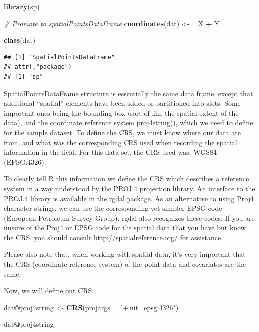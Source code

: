\documentclass[10pt,b5paper,]{book}
\newenvironment{Shaded}{\begin{snugshade}}{\end{snugshade}}
\newcommand{\CommentTok}[1]{\textcolor[rgb]{0.56,0.35,0.01}{\textit{#1}}}
\newcommand{\DataTypeTok}[1]{\textcolor[rgb]{0.13,0.29,0.53}{#1}}
\newcommand{\ErrorTok}[1]{\textcolor[rgb]{0.64,0.00,0.00}{\textbf{#1}}}
\newcommand{\KeywordTok}[1]{\textcolor[rgb]{0.13,0.29,0.53}{\textbf{#1}}}
\newcommand{\NormalTok}[1]{#1}
\newcommand{\OperatorTok}[1]{\textcolor[rgb]{0.81,0.36,0.00}{\textbf{#1}}}
\newcommand{\StringTok}[1]{\textcolor[rgb]{0.31,0.60,0.02}{#1}}
\theoremstyle{definition}
\theoremstyle{definition}
\theoremstyle{definition}
\theoremstyle{remark}
\begin{document}
\begin{Shaded}
\begin{Highlighting}[]
\KeywordTok{library}\NormalTok{(sp)}

\CommentTok{# Promote to spatialPointsDataFrame}
\KeywordTok{coordinates}\NormalTok{(dat) <-}\StringTok{ }\ErrorTok{~}\StringTok{ }\NormalTok{X }\OperatorTok{+}\StringTok{ }\NormalTok{Y}

\KeywordTok{class}\NormalTok{(dat)}
\end{Highlighting}
\end{Shaded}

\begin{verbatim}
## [1] "SpatialPointsDataFrame"
## attr(,"package")
## [1] "sp"
\end{verbatim}

SpatialPointsDataFrame structure is essentially the same data frame,
except that additional ``spatial'' elements have been added or
partitioned into slots. Some important ones being the bounding box (sort
of like the spatial extent of the data), and the coordinate reference
system proj4string(), which we need to define for the sample dataset. To
define the CRS, we must know where our data are from, and what was the
corresponding CRS used when recording the spatial information in the
field. For this data set, the CRS used was: WGS84 (EPSG:4326).

To clearly tell R this information we define the CRS which describes a
reference system in a way understood by the
\href{http://trac.osgeo.org/proj/}{PROJ.4 projection library}. An
interface to the PROJ.4 library is available in the rgdal package. As an
alternative to using Proj4 character strings, we can use the
corresponding yet simpler EPSG code (European Petroleum Survey Group).
rgdal also recognizes these codes. If you are unsure of the Proj4 or
EPSG code for the spatial data that you have but know the CRS, you
should consult \url{http://spatialreference.org/} for assistance.

Please also note that, when working with spatial data, it's very
important that the CRS (coordinate reference system) of the point data
and covariates are the same.

Now, we will define our CRS:

\begin{Shaded}
\begin{Highlighting}[]
\NormalTok{dat}\OperatorTok{@}\NormalTok{proj4string <-}\StringTok{ }\KeywordTok{CRS}\NormalTok{(}\DataTypeTok{projargs =} \StringTok{"+init=epsg:4326"}\NormalTok{)}

\NormalTok{dat}\OperatorTok{@}\NormalTok{proj4string}
\end{Highlighting}
\end{Shaded}
\end{document}
